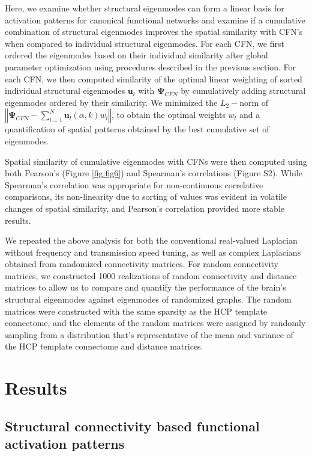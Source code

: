 Here, we examine whether structural eigenmodes can form a linear basis for activation patterns for canonical functional networks and examine if a cumulative combination of  structural eigenmodes improves the spatial similarity with CFN's when compared to individual structural eigenmodes. For each CFN, we first ordered the eigenmodes based on their individual similarity after global parameter optimization using procedures described in the previous section. For each CFN, we then computed similarity of the optimal linear weighting of sorted individual structural eigenmodes $\mathbf{u}_l$ with $\mathbf{\Psi}_{CFN}$ by cumulatively adding structural eigenmodes ordered by their similarity. We minimized the $L_2-\textrm{norm}$ of $\left\Vert \mathbf{\Psi}_{CFN}-\sum_{l=1}^{N} \mathbf{u}_{l}(\alpha,k) w_{l} \right\Vert$, to obtain the optimal weights $w_l$ and a quantification of spatial patterns obtained by the best cumulative set of eigenmodes.

Spatial similarity of cumulative eigenmodes with CFNs were then computed using both Pearson's (Figure \ref{fig:fig6}) and Spearman's correlations (Figure S2). While Spearman's correlation was appropriate for non-continuous correlative comparisons, its non-linearity due to sorting of values was evident in volatile changes of spatial similarity, and Pearson's correlation provided more stable results.

We repeated the above analysis for both the conventional real-valued Laplacian without frequency and transmission speed tuning, as well as complex Laplacians obtained from randomized connectivity matrices. For random connectivity matrices, we constructed 1000 realizations of random connectivity and distance matrices to allow us to compare and quantify the performance of the brain's structural eigenmodes against eigenmodes of randomized graphs. The random matrices were constructed with the same sparsity as the HCP template connectome, and the elements of the random matrices were assigned by randomly sampling from a distribution that's representative of the mean and variance of the HCP template connectome and distance matrices.

\section{Results}

\subsection{Structural connectivity based functional activation patterns}

